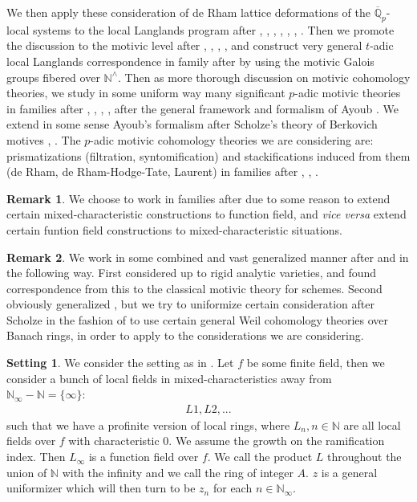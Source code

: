 \documentclass[12pt]{article}
\theoremstyle{definition}
\newtheorem{remark}{Remark}
\newtheorem{setting}{Setting}
\begin{document}
\indent We then apply these consideration of de Rham lattice deformations of the $\overline{\mathbb{Q}}_p$-local systems to the local Langlands program after \cite{L1}, \cite{1FS}, \cite{1VL}, \cite{1GL}, \cite{D}, \cite{1LL}, \cite{D2}. Then we promote the discussion to the motivic level after \cite{1S5}, \cite{1S6}, \cite{2LH}, \cite{2A}, \cite{1RS} and construct very general $t$-adic local Langlands correspondence in family after \cite{2LH} by using the motivic Galois groups fibered over $\mathbb{N}^\wedge$. Then as more thorough discussion on motivic cohomology theories, we study in some uniform way many significant $p$-adic motivic theories in families after \cite{3G}, \cite{3A}, \cite{31A}, \cite{3V}, after the general framework and formalism of Ayoub \cite{3A}. We extend in some sense Ayoub's formalism after Scholze's theory of Berkovich motives \cite{3S}, \cite{3S2}. The $p$-adic motivic cohomology theories we are considering are: prismatizations (filtration, syntomification) and stackifications induced from them (de Rham, de Rham-Hodge-Tate, Laurent) in families after \cite{3BS}, \cite{3BL}, \cite{3D}. 


\begin{remark}
We choose to work in families after \cite{3LH} due to some reason to extend certain mixed-characteristic constructions to function field, and \textit{vice versa} extend certain funtion field constructions to mixed-characteristic situations.
\end{remark}


\begin{remark}
We work in some combined and vast generalized manner after \cite{3A} and \cite{3S} in the following way. First \cite{3A} considered up to rigid analytic varieties, and found correspondence from this to the classical motivic theory for schemes. Second \cite{3S} obviously generalized \cite{3A}, but we try to uniformize certain consideration after Scholze in the fashion of \cite{3A} to use certain general Weil cohomology theories over Banach rings, in order to apply to the considerations we are considering. 
\end{remark}


\begin{setting}
We consider the setting as in \cite{3LH}. Let $f$ be some finite field, then we consider a bunch of local fields in mixed-characteristics away from $\mathbb{N}_\infty - \mathbb{N}= \{\infty\}$:
\begin{align}
L1,L2,...
\end{align}
such that we have a profinite version of local rings, where $L_n,n\in \mathbb{N}$ are all local fields over $f$ with characteristic $0$. We assume the growth on the ramification index. Then $L_\infty$ is a function field over $f$. We call the product $L$ throughout the union of $\mathbb{N}$ with the infinity and we call the ring of integer $A$. $z$ is a general uniformizer which will then turn to be $z_n$ for each $n\in \mathbb{N}_\infty$.
\end{setting}
\end{document}
